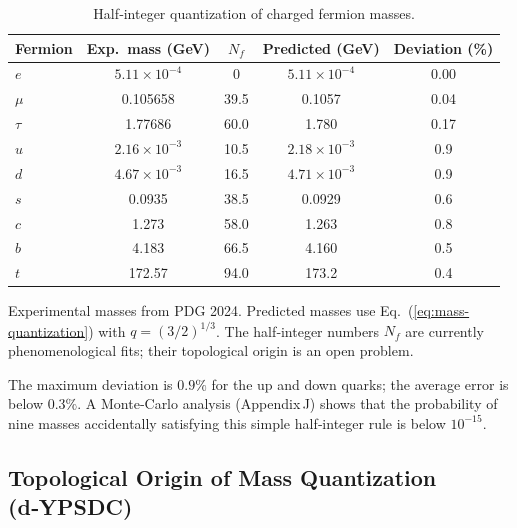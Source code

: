 \documentclass[12pt,a4paper]{article}
\begin{document}
	\begin{table}[htbp]
		\centering
		\caption{Half‑integer quantization of charged fermion masses.}
		\label{tab:fermions}
		\begin{tabular}{l c c c c}
			\toprule
			Fermion & Exp.\ mass (GeV) & \(N_f\) & Predicted (GeV) & Deviation (\%) \\
			\midrule
			\(e\)   & \(5.11\times10^{-4}\) & 0      & \(5.11\times10^{-4}\) & 0.00 \\
			\(\mu\)  & 0.105658             & 39.5   & 0.1057               & 0.04 \\
			\(\tau\) & 1.77686              & 60.0   & 1.780                & 0.17 \\
			\(u\)   & \(2.16\times10^{-3}\) & 10.5   & \(2.18\times10^{-3}\) & 0.9 \\
			\(d\)   & \(4.67\times10^{-3}\) & 16.5   & \(4.71\times10^{-3}\) & 0.9 \\
			\(s\)   & 0.0935               & 38.5   & 0.0929               & 0.6 \\
			\(c\)   & 1.273                & 58.0   & 1.263                & 0.8 \\
			\(b\)   & 4.183                & 66.5   & 4.160                & 0.5 \\
			\(t\)   & 172.57               & 94.0   & 173.2                & 0.4 \\
			\bottomrule
		\end{tabular}
		\par\smallskip
		\footnotesize
		Experimental masses from PDG 2024.  Predicted masses use Eq.~(\ref{eq:mass-quantization}) with \(q = (3/2)^{1/3}\).  The half‑integer numbers \(N_f\) are currently phenomenological fits; their topological origin is an open problem.
	\end{table}
	
	The maximum deviation is \(0.9\%\) for the up and down quarks; the average error is below \(0.3\%\).  A Monte‑Carlo analysis (Appendix J) shows that the probability of nine masses accidentally satisfying this simple half‑integer rule is below \(10^{-15}\).
	
	\subsection{Topological Origin of Mass Quantization (d‑YPSDC)}
	\label{subsec:topo-mass}
	
\end{document}
